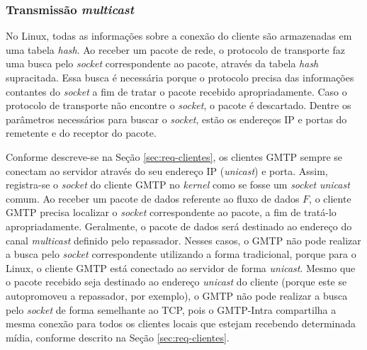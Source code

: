 
\subsubsection{Transmissão \textit{multicast}}
 \label{sec:transm-multicast}

No Linux, todas as informações sobre a conexão do cliente são armazenadas em uma tabela \textit{hash}. 
Ao receber um pacote de rede, o protocolo de transporte faz uma busca pelo \textit{socket} correspondente ao pacote, através da tabela \textit{hash} supracitada. Essa busca é necessária porque o protocolo precisa das informações contantes do \textit{socket} a fim de tratar o pacote recebido apropriadamente. 
Caso o protocolo de transporte não encontre o \textit{socket}, o pacote é descartado.
Dentre os parâmetros necessários para buscar o \textit{socket}, estão os endereços IP e portas do remetente e do receptor do pacote.

Conforme descreve-se na Seção \ref{sec:req-clientes}, os clientes GMTP sempre se conectam ao servidor através do seu endereço IP (\textit{unicast}) e porta. Assim, registra-se o \textit{socket} do cliente GMTP no \textit{kernel} como se fosse um \textit{socket} \textit{unicast} comum.
Ao receber um pacote de dados referente ao fluxo de dados $F$, o cliente GMTP precisa localizar o \textit{socket} correspondente ao pacote, a fim de tratá-lo apropriadamente. 
Geralmente, o pacote de dados será destinado ao endereço do canal \textit{multicast} definido pelo repassador. Nesses casos, o GMTP não pode realizar a busca pelo \textit{socket} correspondente utilizando a forma tradicional, porque para o Linux, o cliente GMTP está conectado ao servidor de forma \textit{unicast}. 
Mesmo que o pacote recebido seja destinado ao endereço \textit{unicast} do cliente (porque este se autopromoveu a repassador, por exemplo), o GMTP não pode realizar a busca pelo \textit{socket} de forma semelhante ao TCP, pois o GMTP-Intra compartilha a mesma conexão para todos os clientes locais que estejam recebendo determinada mídia, conforme descrito na Seção \ref{sec:req-clientes}.

